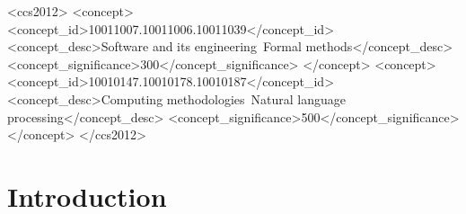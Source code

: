\documentclass[sigconf,review,anonymous]{acmart}
\begin{document}
\begin{CCSXML}
<ccs2012>
  <concept>
    <concept_id>10011007.10011006.10011039</concept_id>
    <concept_desc>Software and its engineering~Formal methods</concept_desc>
    <concept_significance>300</concept_significance>
  </concept>
  <concept>
    <concept_id>10010147.10010178.10010187</concept_id>
    <concept_desc>Computing methodologies~Natural language processing</concept_desc>
    <concept_significance>500</concept_significance>
  </concept>
</ccs2012>
\end{CCSXML}



\maketitle

\section{Introduction}
\label{sec:intro}
\end{document}
